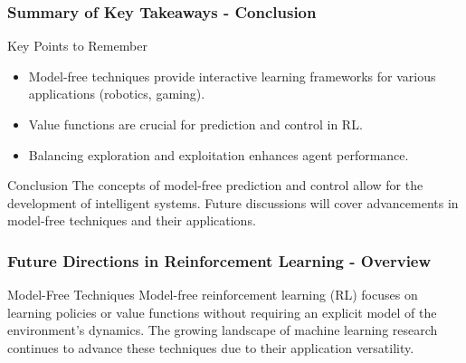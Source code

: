 \documentclass[aspectratio=169]{beamer}
\begin{document}
\begin{frame}[fragile]
    \frametitle{Summary of Key Takeaways - Conclusion}
    \begin{block}{Key Points to Remember}
        \begin{itemize}
            \item Model-free techniques provide interactive learning frameworks for various applications (robotics, gaming).
            \item Value functions are crucial for prediction and control in RL.
            \item Balancing exploration and exploitation enhances agent performance.
        \end{itemize}
    \end{block}

    \begin{block}{Conclusion}
        The concepts of model-free prediction and control allow for the development of intelligent systems. Future discussions will cover advancements in model-free techniques and their applications.
    \end{block}
\end{frame}

\begin{frame}[fragile]
    \frametitle{Future Directions in Reinforcement Learning - Overview}
    \begin{block}{Model-Free Techniques}
        Model-free reinforcement learning (RL) focuses on learning policies or value functions without requiring an explicit model of the environment's dynamics. 
        The growing landscape of machine learning research continues to advance these techniques due to their application versatility.
    \end{block}
\end{frame}
\end{document}
